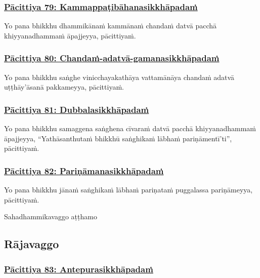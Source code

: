 \subsubsection*{\hyperref[exp79]{Pācittiya 79: Kammappaṭibāhanasikkhāpadaṁ}}
\label{pac79}

Yo pana bhikkhu dhammikānaṁ kammānaṁ chandaṁ datvā pacchā khiyyanadhammaṁ āpajjeyya, pācittiyaṁ.



\subsubsection*{\hyperref[exp80]{Pācittiya 80: Chandaṁ-adatvā-gamanasikkhāpadaṁ}}
\label{pac80}

Yo pana bhikkhu saṅghe vinicchayakathāya vattamānāya chandaṁ adatvā uṭṭhāy'āsanā pakkameyya, pācittiyaṁ.



\subsubsection*{\hyperref[exp81]{Pācittiya 81: Dubbalasikkhāpadaṁ}}
\label{pac81}

Yo pana bhikkhu samaggena saṅghena cīvaraṁ datvā pacchā khiyyanadhammaṁ āpajjeyya, ``Yathāsanthutaṁ bhikkhū saṅghikaṁ lābhaṁ pariṇāmentī'ti'', pācittiyaṁ.



\subsubsection*{\hyperref[exp82]{Pācittiya 82: Pariṇāmanasikkhāpadaṁ}}
\label{pac82}

Yo pana bhikkhu jānaṁ saṅghikaṁ lābhaṁ pariṇataṁ puggalassa pariṇāmeyya, pācittiyaṁ.

\begin{center}
	Sahadhammikavaggo aṭṭhamo
\end{center}



\subsection{Rājavaggo}

\subsubsection*{\hyperref[exp83]{Pācittiya 83: Antepurasikkhāpadaṁ}}
\label{pac83}


